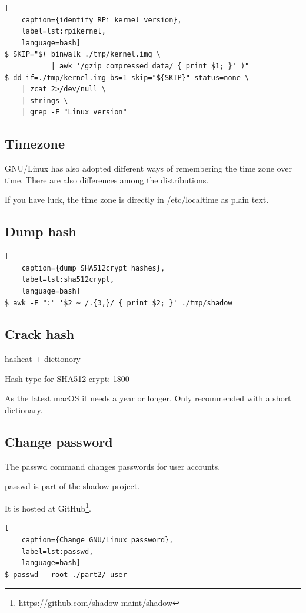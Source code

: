 \begin{lstlisting}[
    caption={identify RPi kernel version},
    label=lst:rpikernel,
    language=bash]
$ SKIP="$( binwalk ./tmp/kernel.img \
           | awk '/gzip compressed data/ { print $1; }' )"
$ dd if=./tmp/kernel.img bs=1 skip="${SKIP}" status=none \
    | zcat 2>/dev/null \
    | strings \
    | grep -F "Linux version"
\end{lstlisting}

\subsection{Timezone}

GNU/Linux has also adopted different ways of remembering the time zone over time. There are also differences among the distributions.

If you have luck, the time zone is directly in /etc/localtime as plain text.

\subsection{Dump hash}

\begin{lstlisting}[
    caption={dump SHA512crypt hashes},
    label=lst:sha512crypt,
    language=bash]
$ awk -F ":" '$2 ~ /.{3,}/ { print $2; }' ./tmp/shadow
\end{lstlisting}

\subsection{Crack hash}

hashcat + dictionory

Hash type for SHA512-crypt: 1800

As the latest macOS it needs a year or longer. Only recommended with a short dictionary.

\subsection{Change password}

The passwd command changes passwords for user accounts.

passwd is part of the shadow project.

It is hosted at GitHub\footnote{https://github.com/shadow-maint/shadow}.

\begin{lstlisting}[
    caption={Change GNU/Linux password},
    label=lst:passwd,
    language=bash]
$ passwd --root ./part2/ user
\end{lstlisting}

